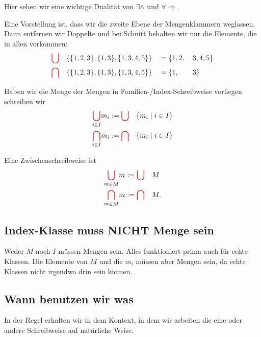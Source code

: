 \documentclass[a4paper]{amsart}
\theoremstyle{definition}
\begin{document}
Hier sehen wir eine wichtige Dualität von $\exists \land$ und $\forall \Rightarrow$.

Eine Vorstellung ist, dass wir die zweite Ebene der Mengenklammern weglassen. Dann entfernen wir Doppelte und bei Schnitt behalten wir nur die Elemente, die in allen vorkommen:
\begin{alignat}{4}
   &{\color{red} \bigcup} &&\{ \{ 1, 2, 3 \}, \{ 1, 3 \}, \{ 1, 3, 4, 5 \} \} && = \{ 1, 2, &&\,3, 4, 5 \}\\
   &{\color{red} \bigcap} &&\{ \{ 1, 2, 3 \}, \{ 1, 3 \}, \{ 1, 3, 4, 5 \} \} && = \{ 1,    &&\,3 \}
\end{alignat}

Haben wir die Menge der Mengen in Familien-/Index-Schreibweise vorliegen schreiben wir
\begin{alignat}{4}\label{Index}
   &{\color{red} \bigcup_{\color{black}i \in I}} m_i := {\color{red} \bigcup} &&\{ m_i \mid i \in I \}\\
   &{\color{red} \bigcap_{\color{black}i \in I}} m_i := {\color{red} \bigcap} &&\{ m_i \mid i \in I \}
\end{alignat}

Eine Zwischenschreibweise ist
\begin{alignat}{4}\label{Zwischen}
   &{\color{red} \bigcup_{\color{black} m \in M}} m := {\color{red} \bigcup} &&M\\
   &{\color{red} \bigcap_{\color{black} m \in M}} m := {\color{red} \bigcap} &&M.
\end{alignat}

\subsection{Index-Klasse muss NICHT Menge sein}
Weder $M$ noch $I$ müssen Mengen sein. Alles funktioniert prima auch für echte Klassen. Die Elemente von $M$ und die $m_i$ müssen aber Mengen sein, da echte Klassen nicht irgendwo drin sein können.

\subsection{Wann benutzen wir was}
In der Regel erhalten wir in dem Kontext, in dem wir arbeiten die eine oder andere Schreibweise auf natürliche Weise. 
\end{document}
